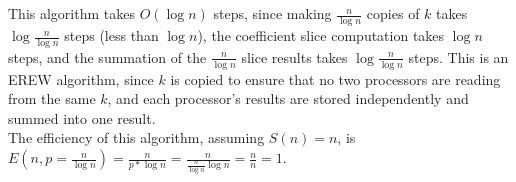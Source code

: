 \documentclass[letterpaper,notitlepage,twoside]{article}
\begin{document}
\\\\
This algorithm takes $O(\log n)$ steps, since making $\frac{n}{\log n}$ copies of $k$ takes $\log \frac{n}{\log n}$ steps (less than $\log n$), the coefficient slice computation takes $\log n$ steps, and the summation of the $\frac{n}{\log n}$ slice results takes $\log \frac{n}{\log n}$ steps. This is an EREW algorithm, since $k$ is copied to ensure that no two processors are reading from the same $k$, and each processor's results are stored independently and summed into one result.
\\
The efficiency of this algorithm, assuming $S(n) = n$, is $E(n, p = \frac{n}{\log n}) = \frac{n}{p * \log n} = \frac{n}{\frac{n}{\log n} \log n} = \frac{n}{n} = 1$.
\end{document}
